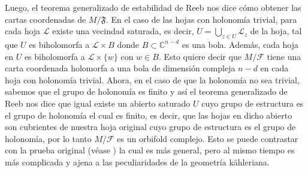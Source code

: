 \documentclass[letterpaper]{report}
\newcommand{\co}{\ensuremath{\mathbb C }}
\begin{document}
Luego, el teorema generalizado de estabilidad de Reeb \cite{Thurston} nos dice c\'omo obtener las cartas coordenadas de $M/\mathfrak{F}$. 
En el caso de las hojas con holonom\'ia trivial, para cada hoja $\mathcal{L}$ existe una vecindad saturada, es decir, $U=\bigcup_{z\in U}\mathcal{L}_z$ de la hoja, 
tal que $U$ es biholomorfa a $\mathcal{L}\times B$ donde $B\subset\co^{n-d}$ es una bola. Adem\'as, cada hoja en $U$ es biholomorfa a $\mathcal{L}\times\{w\}$ con $w\in B$. 
Esto quiere decir que $M/\mathcal{F}$ tiene una carta coordenada holomorfa a una bola de dimensi\'on compleja $n-d$ en cada hoja 
con holonom\'ia trivial. Ahora, en el caso de que la holonom\'ia no sea trivial, sabemos que el grupo de holonom\'ia es 
finito y as\'i el teorema generalizado de Reeb \cite{Thurston} nos dice que igual existe un abierto saturado $U$ 
cuyo grupo de estructura es el grupo de holonom\'ia el cual es finito, es decir, que las hojas en dicho abierto son 
cubrientes de nuestra hoja original cuyo grupo de estructura es el grupo de holonom\'ia, por lo tanto $M/\mathcal{F}$ es un orbifold complejo.
Esto se puede contrastar con la prueba original (v\'ease \cite{EMS}) la cual es m\'as general, pero al mismo tiempo es m\'as 
complicada y ajena a las peculiaridades de la geometr\'ia k\"ahleriana. 
\end{document}
